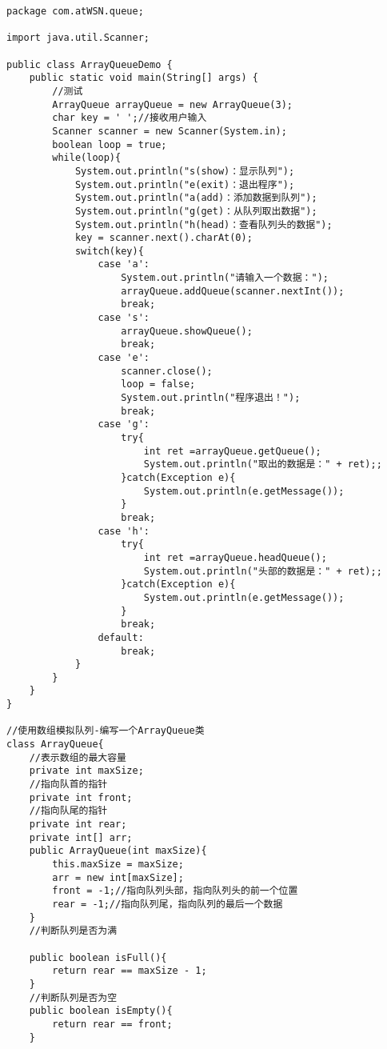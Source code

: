 \documentclass[a4paper]{report}
\begin{document}
\begin{lstlisting}
package com.atWSN.queue;

import java.util.Scanner;

public class ArrayQueueDemo {
    public static void main(String[] args) {
        //测试
        ArrayQueue arrayQueue = new ArrayQueue(3);
        char key = ' ';//接收用户输入
        Scanner scanner = new Scanner(System.in);
        boolean loop = true;
        while(loop){
            System.out.println("s(show)：显示队列");
            System.out.println("e(exit)：退出程序");
            System.out.println("a(add)：添加数据到队列");
            System.out.println("g(get)：从队列取出数据");
            System.out.println("h(head)：查看队列头的数据");
            key = scanner.next().charAt(0);
            switch(key){
                case 'a':
                    System.out.println("请输入一个数据：");
                    arrayQueue.addQueue(scanner.nextInt());
                    break;
                case 's':
                    arrayQueue.showQueue();
                    break;
                case 'e':
                    scanner.close();
                    loop = false;
                    System.out.println("程序退出！");
                    break;
                case 'g':
                    try{
                        int ret =arrayQueue.getQueue();
                        System.out.println("取出的数据是：" + ret);;
                    }catch(Exception e){
                        System.out.println(e.getMessage());
                    }
                    break;
                case 'h':
                    try{
                        int ret =arrayQueue.headQueue();
                        System.out.println("头部的数据是：" + ret);;
                    }catch(Exception e){
                        System.out.println(e.getMessage());
                    }
                    break;
                default:
                    break;
            }
        }
    }
}

//使用数组模拟队列-编写一个ArrayQueue类
class ArrayQueue{
    //表示数组的最大容量
    private int maxSize;
    //指向队首的指针
    private int front;
    //指向队尾的指针
    private int rear;
    private int[] arr;
    public ArrayQueue(int maxSize){
        this.maxSize = maxSize;
        arr = new int[maxSize];
        front = -1;//指向队列头部，指向队列头的前一个位置
        rear = -1;//指向队列尾，指向队列的最后一个数据
    }
    //判断队列是否为满

    public boolean isFull(){
        return rear == maxSize - 1;
    }
    //判断队列是否为空
    public boolean isEmpty(){
        return rear == front;
    }


\end{lstlisting}
\end{document}
